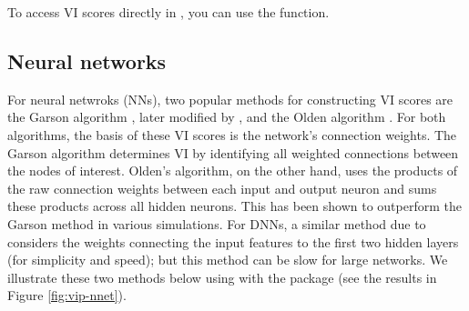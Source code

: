 To access VI scores directly in , you can use the
 function.

\hypertarget{neural-networks}{%
\subsection{Neural networks}\label{neural-networks}}

For neural netwroks (NNs), two popular methods for constructing VI
scores are the Garson algorithm \citep{interpreting-garson-1991}, later
modified by \citet{back-goh-1995}, and the Olden algorithm
\citep{accurate-olden-2004}. For both algorithms, the basis of these VI
scores is the network's connection weights. The Garson algorithm
determines VI by identifying all weighted connections between the nodes
of interest. Olden's algorithm, on the other hand, uses the products of
the raw connection weights between each input and output neuron and sums
these products across all hidden neurons. This has been shown to
outperform the Garson method in various simulations. For DNNs, a similar
method due to \citet{data-gedeon-1997} considers the weights connecting
the input features to the first two hidden layers (for simplicity and
speed); but this method can be slow for large networks. We illustrate
these two methods below using  with the 
package \citep{nnet-pkg} (see the results in Figure \ref{fig:vip-nnet}).

